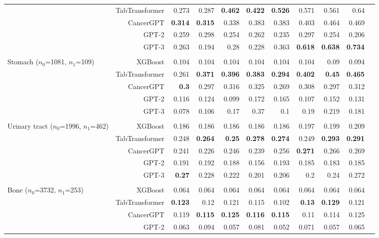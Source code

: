 {\begin{adjustwidth}{-2.5cm}{-2.5cm}
\begin{threeparttable}[!htb]
\begin{tabular}{lrrrrrrrrrr}
&TabTransformer &0.273 &0.287 &\textbf{0.462} &\textbf{0.422} &\textbf{0.526} &0.571 &0.561 &0.64 \\
&CancerGPT &\textbf{0.314} &\textbf{0.315} &0.338 &0.383 &0.383 &0.403 &0.464 &0.469 \\
&GPT-2 &0.259 &0.298 &0.254 &0.262 &0.235 &0.297 &0.254 &0.206 \\
&GPT-3 &0.263 &0.194 &0.28 &0.228 &0.363 &\textbf{0.618} &\textbf{0.638} &\textbf{0.734} \\ \\
\multirowcell{5}{Stomach \\ ($n_0$=1081, $n_1$=109)} &XGBoost &0.104 &0.104 &0.104 &0.104 &0.104 &0.104 &0.09 &0.094 \\
&TabTransformer &0.261 &\textbf{0.371} &\textbf{0.396} &\textbf{0.383} &\textbf{0.294} &\textbf{0.402} &\textbf{0.45} &\textbf{0.465} \\
&CancerGPT &\textbf{0.3} &0.297 &0.316 &0.325 &0.269 &0.308 &0.297 &0.312 \\
&GPT-2 &0.116 &0.124 &0.099 &0.172 &0.165 &0.107 &0.152 &0.131 \\
&GPT-3 &0.078 &0.106 &0.17 &0.37 &0.1 &0.19 &0.219 &0.181 \\ \\
\multirowcell{5}{Urinary tract \\ ($n_0$=1996, $n_1$=462)} &XGBoost &0.186 &0.186 &0.186 &0.186 &0.186 &0.197 &0.199 &0.209 \\
&TabTransformer &0.248 &\textbf{0.264} &\textbf{0.25} &\textbf{0.278} &\textbf{0.274} &0.249 &\textbf{0.293} &\textbf{0.291} \\
&CancerGPT &0.241 &0.226 &0.246 &0.239 &0.256 &\textbf{0.271} &0.266 &0.269 \\
&GPT-2 &0.191 &0.192 &0.188 &0.156 &0.193 &0.185 &0.183 &0.185 \\
&GPT-3 &\textbf{0.27} &0.228 &0.222 &0.201 &0.206 &0.2 &0.24 &0.272 \\ \\
\multirowcell{5}{Bone \\ ($n_0$=3732, $n_1$=253)} &XGBoost &0.064 &0.064 &0.064 &0.064 &0.064 &0.064 &0.064 &0.064 \\
&TabTransformer &\textbf{0.123} &0.12 &0.121 &0.115 &0.102 &\textbf{0.13} &\textbf{0.129} &0.121 \\
&CancerGPT &0.119 &\textbf{0.115} &\textbf{0.125} &\textbf{0.116} &\textbf{0.115} &0.11 &0.114 &0.125 \\
&GPT-2 &0.063 &0.094 &0.057 &0.081 &0.052 &0.071 &0.057 &0.065 \\

\end{tabular}
\end{threeparttable}
\end{adjustwidth}}
